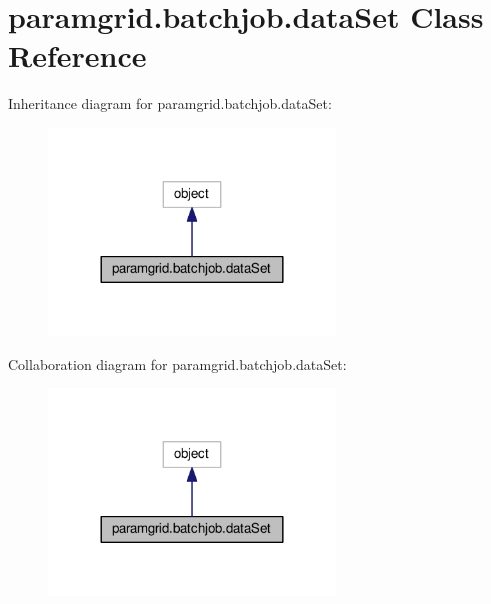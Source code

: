 \hypertarget{classparamgrid_1_1batchjob_1_1dataSet}{}\section{paramgrid.\+batchjob.\+data\+Set Class Reference}
\label{classparamgrid_1_1batchjob_1_1dataSet}


Inheritance diagram for paramgrid.\+batchjob.\+data\+Set\+:
\nopagebreak
\begin{figure}[H]
\begin{center}
\leavevmode
\includegraphics[width=216pt]{classparamgrid_1_1batchjob_1_1dataSet__inherit__graph}
\end{center}
\end{figure}


Collaboration diagram for paramgrid.\+batchjob.\+data\+Set\+:
\nopagebreak
\begin{figure}[H]
\begin{center}
\leavevmode
\includegraphics[width=216pt]{classparamgrid_1_1batchjob_1_1dataSet__coll__graph}
\end{center}
\end{figure}
